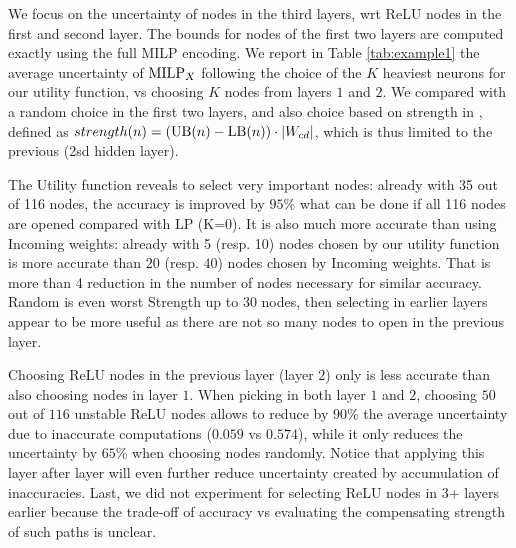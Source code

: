 We focus on the uncertainty of nodes in the third layers, wrt ReLU nodes in the first and second layer. The bounds for nodes of the first two layers are computed exactly using the full MILP encoding. We report in Table \ref{tab:example1} the average uncertainty of ${\textrm{MILP}}_X$ following the choice of the $K$ heaviest neurons for our utility function, vs choosing $K$ nodes from layers $1$ and $2$. We compared with a random choice in the first two layers, and also choice based on strength in \cite{DivideAndSlide}, defined as 
$strength(n) = (\mathrm{UB}(n)-\mathrm{LB}(n))\cdot |W_{cd}|$, which is thus limited to the previous (2sd hidden layer). 

The Utility function reveals to select very important nodes: already with 35 out of 116 nodes, the accuracy is improved by $95\%$ what can be done if all 116 nodes are opened compared with LP (K=0). It is also much more accurate than using Incoming weights: already with 5 (resp. 10) nodes chosen by our utility function is more accurate than $20$ (resp. $40$) nodes chosen by Incoming weights. That is more than 4 reduction in the number of nodes necessary for similar accuracy.  Random is even worst Strength up to 30 nodes, then selecting in earlier layers appear to be more useful as there are not so many nodes to open in the previous layer.

\iffalse
Choosing ReLU nodes in the previous layer (layer $2$) only is less accurate than 
also choosing nodes in layer $1$. When picking in both layer $1$ and $2$, choosing $50$ out of $116$ unstable ReLU nodes allows to reduce by $90\%$ the average uncertainty due to inaccurate computations ($0.059$ vs $0.574$), while it only reduces the uncertainty by $65\%$ when choosing nodes randomly. Notice that applying this layer after layer will even further reduce uncertainty created by accumulation of inaccuracies. 
Last, we did not experiment for selecting ReLU nodes in 3+ layers earlier because the trade-off of accuracy vs evaluating the compensating strength of such paths is unclear.

